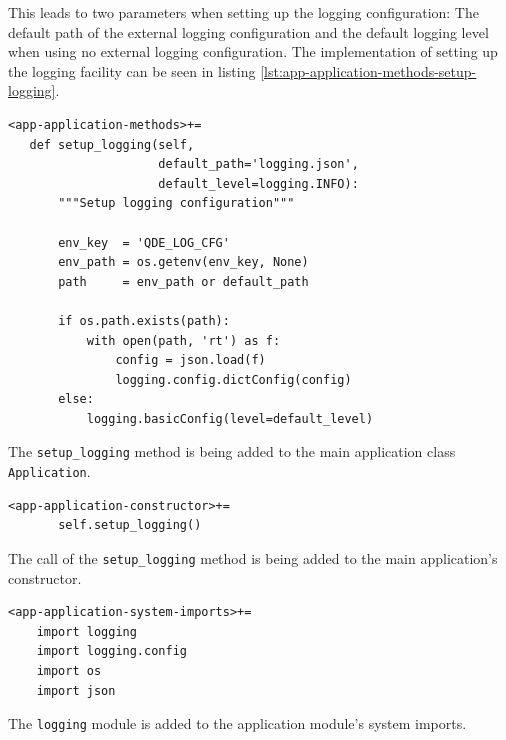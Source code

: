\documentclass[10pt, openright, notitlepage]{scrreprt}
\begin{document}
This leads to two parameters when setting up the logging configuration: The
default path of the external logging configuration and the default logging
level when using no external logging configuration. The implementation of
setting up the logging facility can be seen in listing
\ref{lst:app-application-methods-setup-logging}.

\begin{listing}[H]
\begin{verbatim}
<app-application-methods>+=
   def setup_logging(self,
                     default_path='logging.json',
                     default_level=logging.INFO):
       """Setup logging configuration"""
   
       env_key  = 'QDE_LOG_CFG'
       env_path = os.getenv(env_key, None)
       path     = env_path or default_path
   
       if os.path.exists(path):
           with open(path, 'rt') as f:
               config = json.load(f)
               logging.config.dictConfig(config)
       else:
           logging.basicConfig(level=default_level)
\end{verbatim}
\caption{\label{lst:app-application-methods-setup-logging}
The \texttt{setup\_logging} method is being added to the main application class \texttt{Application}.}
\end{listing}

\begin{listing}[H]
\begin{verbatim}
<app-application-constructor>+=
       self.setup_logging()
\end{verbatim}
\caption{\label{lst:app-application-constructor-call-setup-logging}
The call of the \texttt{setup\_logging} method is being added to the main application's constructor.}
\end{listing}

\begin{listing}[H]
\begin{verbatim}
<app-application-system-imports>+=
    import logging
    import logging.config
    import os
    import json
\end{verbatim}
\caption{\label{lst:app-application-system-imports-logging}
The \texttt{logging} module is added to the application module's system imports.}
\end{listing}
\end{document}
